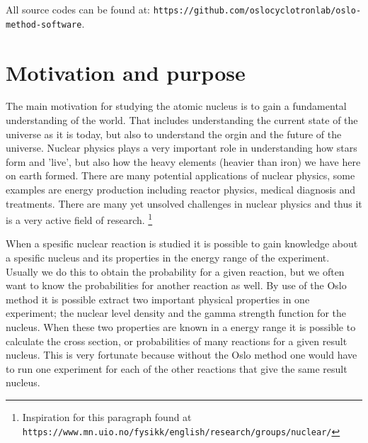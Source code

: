 \documentclass[11pt,a4wide]{article}
\begin{document}
\begin{center}
{ \scriptsize \noindent All source codes can be found at: \texttt{https://github.com/oslocyclotronlab/oslo-method-software}. }
\end{center}

\newpage

\tableofcontents
\newpage

\section{Motivation and purpose}
The main motivation for studying the atomic nucleus is to gain a fundamental understanding of the world. That includes understanding the current state of the universe as it is today, but also to understand the orgin and the future of the universe. Nuclear physics plays a very important role in understanding how stars form and 'live', but also how the heavy elements (heavier than iron) we have here on earth formed. There are many potential applications of nuclear physics, some examples are energy production including reactor physics, medical diagnosis and treatments. There are many yet unsolved challenges in nuclear physics and thus it is a very active field of research. \footnote{Inspiration for this paragraph found at \texttt{https://www.mn.uio.no/fysikk/english/research/groups/nuclear/}}

When a spesific nuclear reaction is studied it is possible to gain knowledge about a spesific nucleus and its properties in the energy range of the experiment. Usually we do this to obtain the probability for a given reaction, but we often want to know the probabilities for another reaction as well. By use of the Oslo method it is possible extract two important physical properties in one experiment; the nuclear level density and the gamma strength function for the nucleus. When these two properties are known in a energy range it is possible to calculate the cross section, or probabilities of many reactions for a given result nucleus. This is very fortunate because without the Oslo method one would have to run one experiment for each of the other reactions that give the same result nucleus. 

\end{document}
